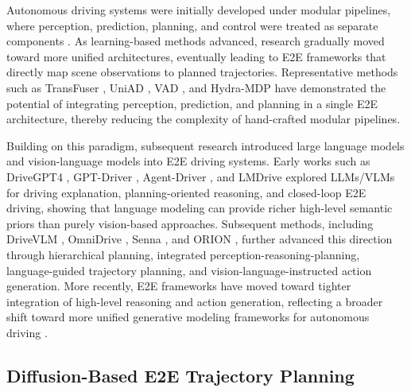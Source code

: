 \documentclass[3p,times,authoryear]{elsarticle}
\begin{document}
Autonomous driving systems were initially developed under modular pipelines, where perception, prediction, planning, and control were treated as separate components \citep{badue2021survey,leng2026seamless}. As learning-based methods advanced, research gradually moved toward more unified architectures, eventually leading to E2E frameworks that directly map scene observations to planned trajectories. Representative methods such as TransFuser \citep{transfuser}, UniAD \citep{hu2023uniad}, VAD \citep{jiang2023vad}, and Hydra-MDP \citep{hydra_mdp} have demonstrated the potential of integrating perception, prediction, and planning in a single E2E architecture, thereby reducing the complexity of hand-crafted modular pipelines. 

Building on this paradigm, subsequent research introduced large language models and vision-language models into E2E driving systems. Early works such as DriveGPT4 \citep{drivegpt4}, GPT-Driver \citep{gptdriver}, Agent-Driver \citep{agentdriver}, and LMDrive \citep{lmdrive} explored LLMs/VLMs for driving explanation, planning-oriented reasoning, and closed-loop E2E driving, showing that language modeling can provide richer high-level semantic priors than purely vision-based approaches. Subsequent methods, including DriveVLM \citep{tian2025drivevlm}, OmniDrive \citep{omnidrive}, Senna \citep{senna}, and ORION \citep{orion}, further advanced this direction through hierarchical planning, integrated perception-reasoning-planning, language-guided trajectory planning, and vision-language-instructed action generation. More recently, E2E frameworks have moved toward tighter integration of high-level reasoning and action generation, reflecting a broader shift toward more unified generative modeling frameworks for autonomous driving \citep{emma,autovla}. 

\subsection{Diffusion-Based E2E Trajectory Planning}
\end{document}
